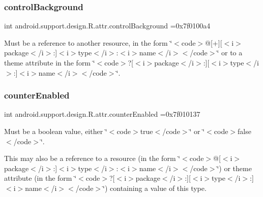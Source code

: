 \subsubsection{\texorpdfstring{control\+Background}{controlBackground}}
{\footnotesize\ttfamily int android.\+support.\+design.\+R.\+attr.\+control\+Background =0x7f0100a4\hspace{0.3cm}{\ttfamily [static]}}

Must be a reference to another resource, in the form \char`\"{}$<$code$>$@\mbox{[}+\mbox{]}\mbox{[}$<$i$>$package$<$/i$>$\+:\mbox{]}$<$i$>$type$<$/i$>$\+:$<$i$>$name$<$/i$>$$<$/code$>$\char`\"{} or to a theme attribute in the form \char`\"{}$<$code$>$?\mbox{[}$<$i$>$package$<$/i$>$\+:\mbox{]}\mbox{[}$<$i$>$type$<$/i$>$\+:\mbox{]}$<$i$>$name$<$/i$>$$<$/code$>$\char`\"{}. \mbox{\label{classandroid_1_1support_1_1design_1_1R_1_1attr_a77bf5ed2837ea33d879fd47228e8cd09}} 
\subsubsection{\texorpdfstring{counter\+Enabled}{counterEnabled}}
{\footnotesize\ttfamily int android.\+support.\+design.\+R.\+attr.\+counter\+Enabled =0x7f010137\hspace{0.3cm}{\ttfamily [static]}}

Must be a boolean value, either \char`\"{}$<$code$>$true$<$/code$>$\char`\"{} or \char`\"{}$<$code$>$false$<$/code$>$\char`\"{}. 

This may also be a reference to a resource (in the form \char`\"{}$<$code$>$@\mbox{[}$<$i$>$package$<$/i$>$\+:\mbox{]}$<$i$>$type$<$/i$>$\+:$<$i$>$name$<$/i$>$$<$/code$>$\char`\"{}) or theme attribute (in the form \char`\"{}$<$code$>$?\mbox{[}$<$i$>$package$<$/i$>$\+:\mbox{]}\mbox{[}$<$i$>$type$<$/i$>$\+:\mbox{]}$<$i$>$name$<$/i$>$$<$/code$>$\char`\"{}) containing a value of this type. \mbox{\label{classandroid_1_1support_1_1design_1_1R_1_1attr_a12f7fde0e57068169405793891fc3a8c}} 
